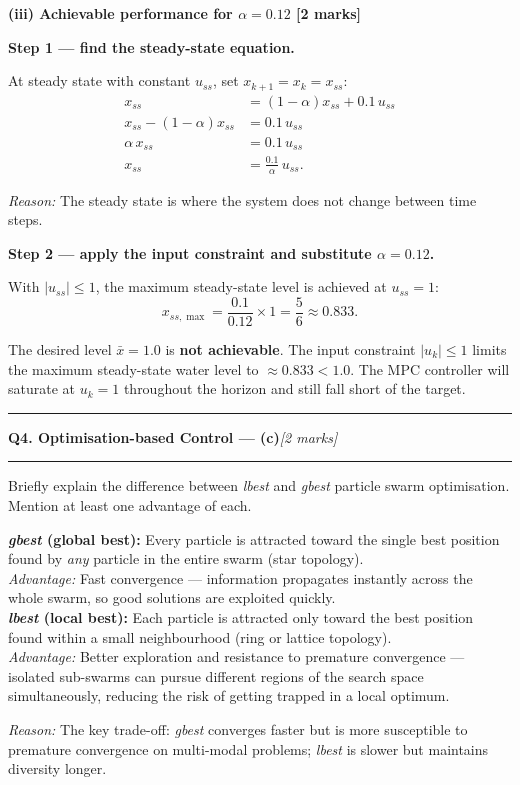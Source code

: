\documentclass[10pt,a4paper]{article}
\newcommand{\sectitle}[2]{%
  \vspace{10pt}\noindent\rule{\linewidth}{0.8pt}\par\vspace{2pt}%
  {\large\textbf{#1}\hfill\normalsize\textit{[#2 marks]}}\par
  \vspace{2pt}\rule{\linewidth}{0.4pt}\vspace{4pt}}
\newcommand{\reason}[1]{%
  \begin{mdframed}[backgroundcolor=reasonbg, linewidth=0.4pt,
    innertopmargin=3pt, innerbottommargin=3pt,
    innerleftmargin=6pt, innerrightmargin=6pt]
    \small\textit{Reason:} \small #1
  \end{mdframed}\vspace{2pt}}
\newenvironment{resultbox}{%
  \begin{mdframed}[backgroundcolor=boxbg, linewidth=0.6pt,
    innertopmargin=5pt, innerbottommargin=5pt,
    innerleftmargin=8pt, innerrightmargin=8pt]
}{\end{mdframed}}
\begin{document}
\bigskip
\noindent\textbf{(iii) Achievable performance for $\alpha=0.12$ [2 marks]}

\textbf{Step 1 --- find the steady-state equation.}

At steady state with constant $u_{ss}$, set $x_{k+1}=x_k=x_{ss}$:
\begin{align*}
  x_{ss}              &= (1-\alpha)x_{ss} + 0.1\,u_{ss} \\
  x_{ss}-(1-\alpha)x_{ss} &= 0.1\,u_{ss} \\
  \alpha\,x_{ss}      &= 0.1\,u_{ss} \\
  x_{ss}              &= \frac{0.1}{\alpha}\,u_{ss}.
\end{align*}

\reason{The steady state is where the system does not change between time steps.}

\textbf{Step 2 --- apply the input constraint and substitute $\alpha=0.12$.}

With $|u_{ss}|\le 1$, the maximum steady-state level is achieved at $u_{ss}=1$:
\[
  x_{ss,\max} = \frac{0.1}{0.12}\times 1 = \frac{5}{6} \approx 0.833.
\]

\begin{resultbox}
The desired level $\bar{x}=1.0$ is \textbf{not achievable}.
The input constraint $|u_k|\le 1$ limits the maximum steady-state water level to
$\approx 0.833 < 1.0$. The MPC controller will saturate at $u_k=1$ throughout
the horizon and still fall short of the target.
\end{resultbox}

\newpage
\sectitle{Q4. Optimisation-based Control --- (c)}{2}

\noindent Briefly explain the difference between \textit{lbest} and \textit{gbest} particle
swarm optimisation. Mention at least one advantage of each.

\begin{resultbox}
\textbf{\textit{gbest} (global best):} Every particle is attracted toward the single
best position found by \emph{any} particle in the entire swarm (star topology).\\[4pt]
\textit{Advantage:} Fast convergence --- information propagates instantly across the
whole swarm, so good solutions are exploited quickly.\\[6pt]

\textbf{\textit{lbest} (local best):} Each particle is attracted only toward the best
position found within a small neighbourhood (ring or lattice topology).\\[4pt]
\textit{Advantage:} Better exploration and resistance to premature convergence ---
isolated sub-swarms can pursue different regions of the search space simultaneously,
reducing the risk of getting trapped in a local optimum.
\end{resultbox}

\reason{The key trade-off: \textit{gbest} converges faster but is more susceptible to
        premature convergence on multi-modal problems; \textit{lbest} is slower but
        maintains diversity longer.}
\end{document}

